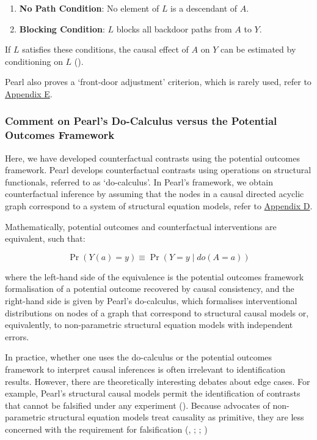 \documentclass[
  single column]{article}
\providecommand{\tightlist}{%
  \setlength{\itemsep}{0pt}\setlength{\parskip}{0pt}}\usepackage{longtable,booktabs,array}
\begin{document}
\begin{enumerate}
\def\labelenumi{\arabic{enumi}.}
\tightlist
\item
  \textbf{No Path Condition}: No element of \(L\) is a descendant of
  \(A\).
\item
  \textbf{Blocking Condition}: \(L\) blocks all backdoor paths from
  \(A\) to \(Y\).
\end{enumerate}

If \(L\) satisfies these conditions, the causal effect of \(A\) on \(Y\)
can be estimated by conditioning on \(\boxed{L}\)
().

Pearl also proves a `front-door adjustment' criterion, which is rarely
used, refer to \hyperref[id-app-e]{Appendix E}.

\subsubsection{Comment on Pearl's Do-Calculus versus the Potential
Outcomes
Framework}\label{comment-on-pearls-do-calculus-versus-the-potential-outcomes-framework}

Here, we have developed counterfactual contrasts using the potential
outcomes framework. Pearl develops counterfactual contrasts using
operations on structural functionals, referred to as `do-calculus'. In
Pearl's framework, we obtain counterfactual inference by assuming that
the nodes in a causal directed acyclic graph correspond to a system of
structural equation models, refer to \hyperref[id-app-d]{Appendix D}.

Mathematically, potential outcomes and counterfactual interventions are
equivalent, such that:

\[
\Pr(Y(a) = y) \equiv \Pr(Y = y \mid do(A = a))
\]

where the left-hand side of the equivalence is the potential outcomes
framework formalisation of a potential outcome recovered by causal
consistency, and the right-hand side is given by Pearl's do-calculus,
which formalises interventional distributions on nodes of a graph that
correspond to structural causal models or, equivalently, to
non-parametric structural equation models with independent errors.

In practice, whether one uses the do-calculus or the potential outcomes
framework to interpret causal inferences is often irrelevant to
identification results. However, there are theoretically interesting
debates about edge cases. For example, Pearl's structural causal models
permit the identification of contrasts that cannot be falsified under
any experiment (). Because advocates of non-parametric structural equation models
treat causality as primitive, they are less concerned with the
requirement for falsification (, ;
;
)
\end{document}
